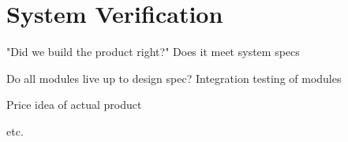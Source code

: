 \chapter{System Verification} \label{ch:SystemVerification}
"Did we build the product right?" Does it meet system specs

Do all modules live up to design spec?
Integration testing of modules

Price idea of actual product

etc.